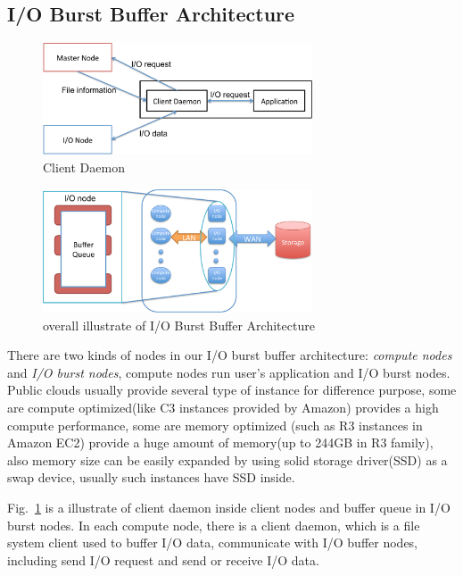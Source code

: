 \subsection{I/O Burst Buffer Architecture}

\begin{figure}[tb]
	\centering
	\includegraphics[width=8cm]{img/client_daemon}
	\caption{Client Daemon}
	\label{architecture:client_daemon}
\end{figure}

\begin{figure}[tb]
	\centering
	\includegraphics[width=8cm]{img/architecture_overview}
	\caption{overall illustrate of I/O Burst Buffer Architecture}
	\label{architecture:overview}
\end{figure}

There are two kinds of nodes in our I/O burst buffer architecture: \emph{compute nodes} and \emph{I/O burst nodes}, compute nodes run user's application and I/O burst nodes.
Public clouds usually provide several type of instance for difference purpose, some are compute optimized(like C3 instances provided by Amazon) provides a high compute performance,
some are memory optimized (such as R3 instances in Amazon EC2) provide a huge amount of memory(up to 244GB in R3 family), also memory size can be easily expanded by using solid storage driver(SSD) as a swap device, usually such instances have SSD inside.

Fig.~\ref{architecture:client_daemon} is a illustrate of client daemon inside client nodes and
buffer queue in I/O burst nodes.
In each compute node, there is a client daemon, which is a file system client used to buffer I/O data, communicate with I/O buffer nodes, including send I/O request and send or receive I/O data.

